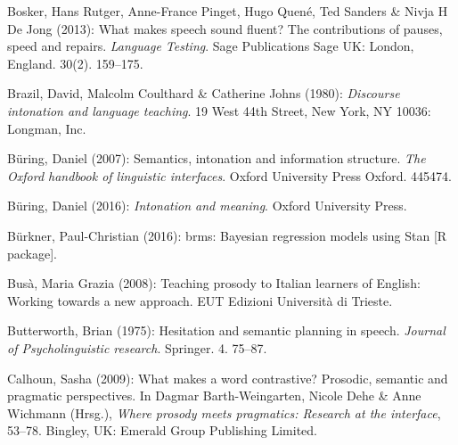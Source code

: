 \begin{styleBibliography}
Bosker, Hans Rutger, Anne-France Pinget, Hugo Quené, Ted Sanders \& Nivja H De Jong (2013): What makes speech sound fluent? The contributions of pauses, speed and repairs. \textit{Language Testing}. Sage Publications Sage UK: London, England. 30(2). 159–175.
\end{styleBibliography}

\begin{styleBibliography}
Brazil, David, Malcolm Coulthard \& Catherine Johns (1980): \textit{Discourse intonation and language teaching}. 19 West 44th Street, New York, NY 10036: Longman, Inc.
\end{styleBibliography}

\begin{styleBibliography}
Büring, Daniel (2007): Semantics, intonation and information structure. \textit{The Oxford handbook of linguistic interfaces}. Oxford University Press Oxford. 445474.
\end{styleBibliography}

\begin{styleBibliography}
Büring, Daniel (2016): \textit{Intonation and meaning}. Oxford University Press.
\end{styleBibliography}

\begin{styleBibliography}
Bürkner, Paul-Christian (2016): brms: Bayesian regression models using Stan [R package].
\end{styleBibliography}

\begin{styleBibliography}
Busà, Maria Grazia (2008): Teaching prosody to Italian learners of English: Working towards a new approach. EUT Edizioni Università di Trieste.
\end{styleBibliography}

\begin{styleBibliography}
Butterworth, Brian (1975): Hesitation and semantic planning in speech. \textit{Journal of Psycholinguistic research}. Springer. 4. 75–87.
\end{styleBibliography}

\begin{styleBibliography}
Calhoun, Sasha (2009): What makes a word contrastive? Prosodic, semantic and pragmatic perspectives. In Dagmar Barth-Weingarten, Nicole Dehe \& Anne Wichmann (Hrsg.), \textit{Where prosody meets pragmatics: Research at the interface}, 53–78. Bingley, UK: Emerald Group Publishing Limited.
\end{styleBibliography}

